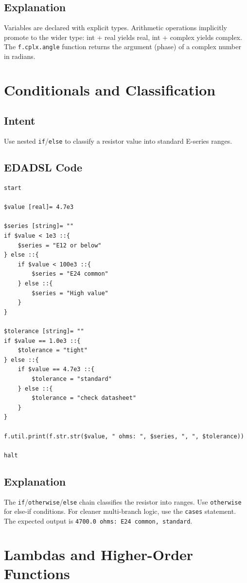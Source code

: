 \subsection{Explanation}
Variables are declared with explicit types. Arithmetic operations implicitly promote to the wider type: int + real yields real, int + complex yields complex. The \texttt{f.cplx.angle} function returns the argument (phase) of a complex number in radians.

\section{Conditionals and Classification}
\subsection{Intent}
Use nested \texttt{if}/\texttt{else} to classify a resistor value into standard E-series ranges.

\subsection{EDADSL Code}
\begin{verbatim}
start

$value [real]= 4.7e3

$series [string]= ""
if $value < 1e3 ::{
    $series = "E12 or below"
} else ::{
    if $value < 100e3 ::{
        $series = "E24 common"
    } else ::{
        $series = "High value"
    }
}

$tolerance [string]= ""
if $value == 1.0e3 ::{
    $tolerance = "tight"
} else ::{
    if $value == 4.7e3 ::{
        $tolerance = "standard"
    } else ::{
        $tolerance = "check datasheet"
    }
}

f.util.print(f.str.str($value, " ohms: ", $series, ", ", $tolerance))

halt
\end{verbatim}

\subsection{Explanation}
The \texttt{if}/\texttt{otherwise}/\texttt{else} chain classifies the resistor into ranges. Use \texttt{otherwise} for else-if conditions. For cleaner multi-branch logic, use the \texttt{cases} statement. The expected output is \texttt{4700.0 ohms: E24 common, standard}.

\section{Lambdas and Higher-Order Functions}
